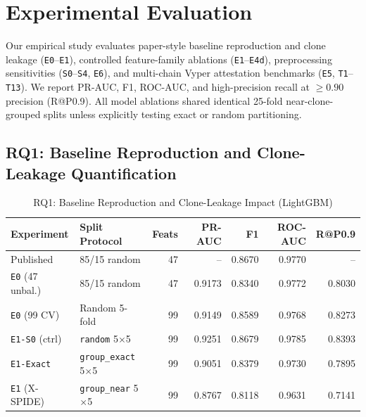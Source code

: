 \documentclass[conference]{IEEEtran}
\begin{document}
\section{Experimental Evaluation}\label{sec:eval}

Our empirical study evaluates paper-style baseline reproduction and clone leakage (\texttt{E0}--\texttt{E1}), controlled feature-family ablations (\texttt{E1}--\texttt{E4d}), preprocessing sensitivities (\texttt{S0}--\texttt{S4}, \texttt{E6}), and multi-chain Vyper attestation benchmarks (\texttt{E5}, \texttt{T1}--\texttt{T13}). We report PR-AUC, F1, ROC-AUC, and high-precision recall at $\ge 0.90$ precision (R@P0.9). All model ablations shared identical 25-fold near-clone-grouped splits unless explicitly testing exact or random partitioning.

\subsection{RQ1: Baseline Reproduction and Clone-Leakage Quantification}\label{sec:rq1}

\begin{table}[t]
\centering
\caption{RQ1: Baseline Reproduction and Clone-Leakage Impact (LightGBM)}
\label{tab:rq1_leakage}
\scriptsize
\setlength{\tabcolsep}{2.5pt}
\begin{tabular}{@{}llrrrrr@{}}
\toprule
Experiment & Split Protocol & Feats & PR-AUC & F1 & ROC-AUC & R@P0.9 \\
\midrule
Published~\cite{pennella2025xspide} & 85/15 random & 47 & -- & 0.8670 & 0.9770 & -- \\
\texttt{E0} (47 unbal.) & 85/15 random & 47 & 0.9173 & 0.8340 & 0.9772 & 0.8030 \\
\texttt{E0} (99 CV) & Random 5-fold & 99 & 0.9149 & 0.8589 & 0.9768 & 0.8273 \\
\midrule
\texttt{E1-S0} (ctrl) & \texttt{random} 5$\times$5 & 99 & 0.9251 & 0.8679 & 0.9785 & 0.8393 \\
\texttt{E1-Exact} & \texttt{group\_exact} 5$\times$5 & 99 & 0.9051 & 0.8379 & 0.9730 & 0.7895 \\
\texttt{E1} (X-SPIDE) & \texttt{group\_near} 5$\times$5 & 99 & 0.8767 & 0.8118 & 0.9631 & 0.7141 \\
\bottomrule
\end{tabular}
\end{table}
\end{document}
